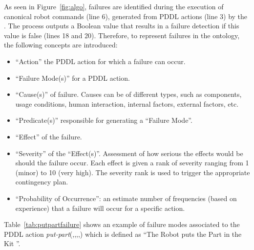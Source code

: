 As seen in Figure~\ref{fig:algo}, failures are identified during the execution of canonical robot commands (line 6), generated from PDDL actions (line 3) by the . The  process outputs a Boolean value that results in a failure detection if this value is false (lines 18 and 20). Therefore, to represent failures in the  ontology, the following concepts are introduced:
\begin{itemize}
 \item ``Action'' the PDDL action for which a failure can occur.
 \item ``Failure Mode(s)'' for a PDDL action.
 \item ``Cause(s)'' of failure. Causes can be of different types, such as  components, usage conditions, human interaction, internal factors, external factors, etc.
 \item ``Predicate(s)'' responsible for generating a ``Failure Mode''.
 \item ``Effect'' of the failure.
 \item ``Severity'' of the ``Effect(s)''. Assessment of how serious the effects would be should the failure occur. Each effect is given a rank of severity ranging from 1 (minor) to 10 (very high). The severity rank is used to trigger the appropriate contingency plan.
 \item ``Probability of Occurrence'': an estimate number of frequencies (based on experience) that a failure will occur for a specific action.
\end{itemize}

Table~\ref{tab:putpartfailure} shows an example of failure modes associated to the PDDL action \textit{put-part}(,,,,) which is defined as ``The Robot  puts the Part  in the Kit ''.

